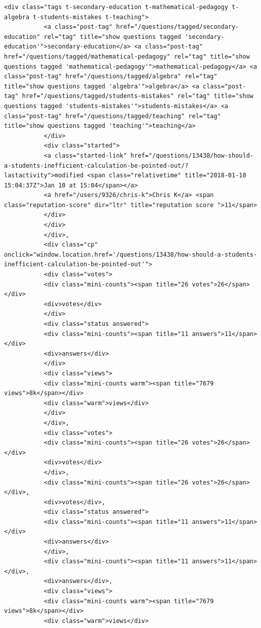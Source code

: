 \documentclass[11pt]{article}
\begin{document}
\begin{Verbatim}[commandchars=\\\{\}]
           <div class="tags t-secondary-education t-mathematical-pedagogy t-algebra t-students-mistakes t-teaching">
           <a class="post-tag" href="/questions/tagged/secondary-education" rel="tag" title="show questions tagged 'secondary-education'">secondary-education</a> <a class="post-tag" href="/questions/tagged/mathematical-pedagogy" rel="tag" title="show questions tagged 'mathematical-pedagogy'">mathematical-pedagogy</a> <a class="post-tag" href="/questions/tagged/algebra" rel="tag" title="show questions tagged 'algebra'">algebra</a> <a class="post-tag" href="/questions/tagged/students-mistakes" rel="tag" title="show questions tagged 'students-mistakes'">students-mistakes</a> <a class="post-tag" href="/questions/tagged/teaching" rel="tag" title="show questions tagged 'teaching'">teaching</a>
           </div>
           <div class="started">
           <a class="started-link" href="/questions/13438/how-should-a-students-inefficient-calculation-be-pointed-out/?lastactivity">modified <span class="relativetime" title="2018-01-10 15:04:37Z">Jan 10 at 15:04</span></a>
           <a href="/users/9326/chris-k">Chris K</a> <span class="reputation-score" dir="ltr" title="reputation score ">11</span>
           </div>
           </div>
           </div>,
           <div class="cp" onclick="window.location.href='/questions/13438/how-should-a-students-inefficient-calculation-be-pointed-out'">
           <div class="votes">
           <div class="mini-counts"><span title="26 votes">26</span></div>
           <div>votes</div>
           </div>
           <div class="status answered">
           <div class="mini-counts"><span title="11 answers">11</span></div>
           <div>answers</div>
           </div>
           <div class="views">
           <div class="mini-counts warm"><span title="7679 views">8k</span></div>
           <div class="warm">views</div>
           </div>
           </div>,
           <div class="votes">
           <div class="mini-counts"><span title="26 votes">26</span></div>
           <div>votes</div>
           </div>,
           <div class="mini-counts"><span title="26 votes">26</span></div>,
           <div>votes</div>,
           <div class="status answered">
           <div class="mini-counts"><span title="11 answers">11</span></div>
           <div>answers</div>
           </div>,
           <div class="mini-counts"><span title="11 answers">11</span></div>,
           <div>answers</div>,
           <div class="views">
           <div class="mini-counts warm"><span title="7679 views">8k</span></div>
           <div class="warm">views</div>

\end{Verbatim}
\end{document}
